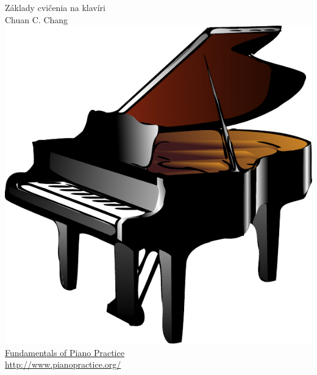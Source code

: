 \pagestyle{empty}
\begin{titlepage}
\begin{center}
\vspace*{5em}
{\noindent\fontsize{40pt}{40pt}\selectfont Základy cvičenia na klavíri}\\
\vspace{5em}
{\fontsize{24pt}{24pt}\selectfont Chuan C. Chang}\\
\vspace{10em}
\includegraphics[scale=0.75]{piano}\\
\vspace{10em}
\href{http://www.pianopractice.org/}{Fundamentals of Piano Practice}\\
\href{http://www.pianopractice.org/}{http://www.pianopractice.org/}\\
\end{center}
\end{titlepage}


